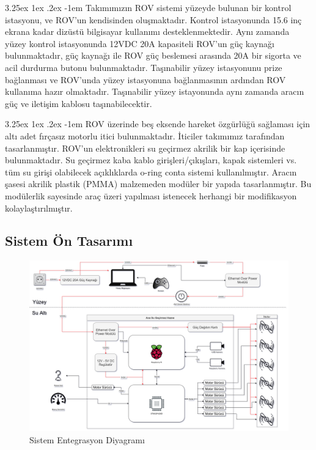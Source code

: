 \documentclass[12pt]{article}
\makeatletter
\renewcommand\paragraph{\@startsection{paragraph}{5}{\z@}%
  {3.25ex \@plus1ex \@minus.2ex}%
  {-1em}%
  {\normalfont\normalsize\bfseries}}
\makeatother
\begin{document}
\paragraph{} Takımımızın ROV sistemi yüzeyde bulunan bir kontrol istasyonu, ve ROV'un kendisinden oluşmaktadır. Kontrol istasyonunda 15.6 inç ekrana kadar dizüstü bilgisayar kullanımı desteklenmektedir. Aynı zamanda yüzey kontrol istasyonunda 12VDC 20A kapasiteli ROV'un güç kaynağı bulunmaktadır, güç kaynağı ile ROV güç beslemesi arasında 20A bir sigorta ve acil durdurma butonu bulunmaktadır. Taşınabilir yüzey istasyonunu prize bağlanması ve ROV'unda yüzey istasyonuna bağlanmasının ardından ROV kullanıma hazır olmaktadır. Taşınabilir yüzey istayonunda aynı zamanda aracın güç ve iletişim kablosu taşınabilecektir. 

\paragraph{} ROV üzerinde beş eksende hareket özgürlüğü sağlaması için altı adet fırçasız motorlu itici bulunmaktadır. İticiler takımımız tarafından tasarlanmıştır. ROV'un elektronikleri su geçirmez akrilik bir kap içerisinde bulunmaktadır. Su geçirmez kaba kablo girişleri/çıkışları, kapak sistemleri vs. tüm su girişi olabilecek açıklıklarda o-ring conta sistemi kullanılmıştır. Aracın şasesi akrilik plastik (PMMA) malzemeden modüler bir yapıda tasarlanmıştır. Bu modülerlik sayesinde araç üzeri yapılması istenecek herhangi bir modifikasyon kolaylaştırılmıştır.

\subsection{Sistem Ön Tasarımı}
\begin{figure}[hbt!]
\centering
\includegraphics[width=1\textwidth]{SID.png}
\caption{Sistem Entegrasyon Diyagramı}
\label{fig:SID}
\end{figure}
\end{document}
